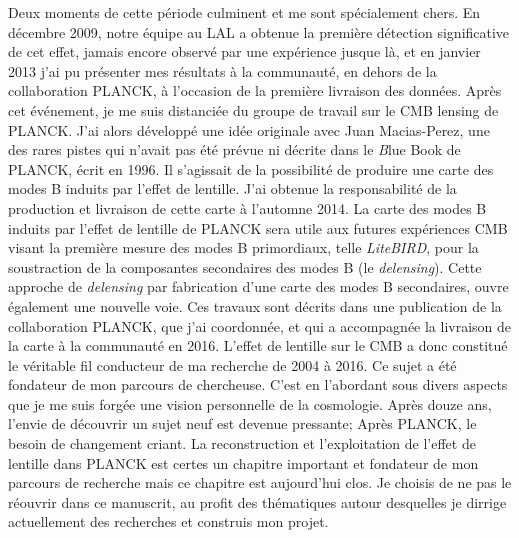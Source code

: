 \documentclass[a4paper, 12pt]{report}
\begin{document}
Deux moments de cette période culminent et me sont spécialement
chers. En décembre 2009, notre équipe au LAL a obtenue la première
détection significative de cet effet, jamais encore observé par une
expérience jusque là, et en janvier 2013 j'ai pu présenter mes
résultats à la communauté, en dehors de la collaboration PLANCK, à
l'occasion de la première livraison des
données. Après cet événement, je me suis distanciée du groupe de
travail sur le CMB lensing de PLANCK. J'ai alors développé une idée
originale avec Juan Macias-Perez, une des
rares pistes qui n'avait pas été prévue ni décrite dans le
{\emph Blue Book} de PLANCK, écrit en 1996. Il s'agissait de la
possibilité de produire une carte des modes B induits par l'effet de
lentille. J'ai obtenue la responsabilité de la production et livraison
de cette carte à l'automne 2014. La carte des modes B induits par
l'effet de lentille de PLANCK sera utile aux futures expériences CMB
visant la première mesure des modes B primordiaux, telle \emph{
  LiteBIRD}, pour la soustraction de la composantes secondaires des
modes B (le \emph{delensing}). Cette approche de \emph{delensing}
par fabrication d'une carte des modes B secondaires, ouvre également
une nouvelle voie. Ces travaux sont décrits dans une publication de la
collaboration PLANCK, que j'ai coordonnée, et qui a accompagnée la
livraison de la carte à la communauté en 2016. 
L'effet de lentille sur le CMB a donc constitué le véritable fil
conducteur de ma recherche de 2004 à 2016.
Ce sujet a été fondateur de mon parcours de chercheuse. C'est en
l'abordant sous divers aspects que je me suis forgée une vision
personnelle de la cosmologie. Après douze ans, l'envie de découvrir un
sujet neuf est devenue pressante; Après PLANCK, le besoin de
changement criant. La reconstruction et l'exploitation de l'effet de
lentille dans PLANCK est certes un chapitre important et fondateur de
mon parcours de recherche mais ce chapitre est aujourd'hui clos. Je
choisis de ne pas le réouvrir dans ce manuscrit, au profit des
thématiques autour desquelles je dirrige actuellement des recherches et
construis mon projet.
\end{document}
